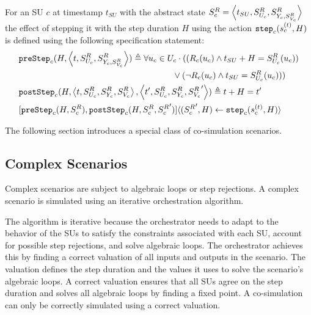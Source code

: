   \begin{definition}\label{def:step}
    For an SU $c$ at timestamp $t_{SU}$ with the abstract state $S^{R}_{c} =  \left\langle t_{SU},S^{R}_{U_{c}}, S^{R}_{Y_{c}, S^{R}_{V_c}} \right\rangle $ the effect of stepping it with the step duration $H$ using the action $\mathtt{step}_{c}(s_{c}^{(t)}, H)$ is defined using the following specification statement:
    \begin{align}
      &\mathtt{preStep}_{c}(H,  \left\langle t,S^{R}_{U_{c}}, S^{R}_{Y_{c}, S^{R}_{V_c}} \right\rangle ) \triangleq 
      \forall u_{c} \in U_{c}
      \cdot 
      ((R_{c}(u_{c}) \land t_{SU} + H = S^{R}_{U_{c}}(u_{c}))
      \nonumber \\
      &\qquad \qquad \qquad \qquad \qquad \qquad \qquad \qquad \qquad 
      \lor 
      (\neg R_{c}(u_{c}) \land t_{SU} = S^{R}_{U_{c}}(u_{c})))
      \nonumber \\
      &\mathtt{postStep}_{c}(H,  \left\langle t,S^{R}_{U_{c}}, S^{R}_{Y_{c}}, S^{R}_{V_c} \right\rangle ,  \left\langle t',S^{R}_{U_{c}}, S^{R}_{Y_{c}}, {S^{R}_{V_c}}' \right\rangle ) \triangleq t + H = t' \nonumber \\
      &[\mathtt{preStep}_{c}(H, S^{R}_{c}), 
      \mathtt{postStep}_{c}(H, S^{R}_{c}, {S^{R}_{c}}')] 
      \langle ({S^{R}_{c}}', H) \gets \mathtt{step}_{c}(s_{c}^{(t)},H) \rangle \nonumber
    \end{align}
  \end{definition}


The following section introduces a special class of co-simulation scenarios.


\subsection{Complex Scenarios}
Complex scenarios are subject to algebraic loops or step rejections.
A complex scenario is simulated using an iterative orchestration algorithm.

The algorithm is iterative because the orchestrator needs to adapt to the behavior of the SUs to satisfy the constraints associated with each SU, account for possible step rejections, and solve algebraic loops. 
The orchestrator achieves this by finding a correct valuation of all inputs and outputs in the scenario.
The valuation defines the step duration and the values it uses to solve the scenario's algebraic loops. 
A correct valuation ensures that all SUs agree on the step duration and solves all algebraic loops by finding a fixed point.
A co-simulation can only be correctly simulated using a correct valuation.

